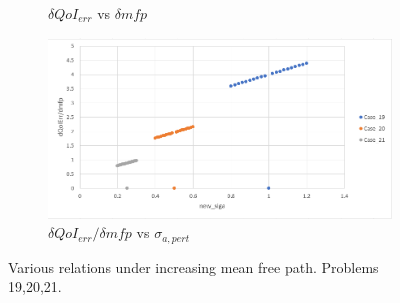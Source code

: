 \documentclass{article}
\begin{document}
\begin{figure}[H]
\begin{subfigure}{.49\textwidth}
  \caption{$\delta QoI_{err}$ vs $\delta mfp$}
  \label{fig:sub3}
\end{subfigure}
\begin{subfigure}{.49\textwidth}
  \centering
  \includegraphics[width=1\linewidth]{dQOIdivMfpVsSiga1.png}
  \caption{$\delta QoI_{err}/\delta mfp$ vs $\sigma_{a,pert}$}
  \label{fig:sub4}
\end{subfigure}
\caption{Various relations under increasing mean free path. Problems 19,20,21.}
\label{fig:Comp1}
\end{figure}
\end{document}
